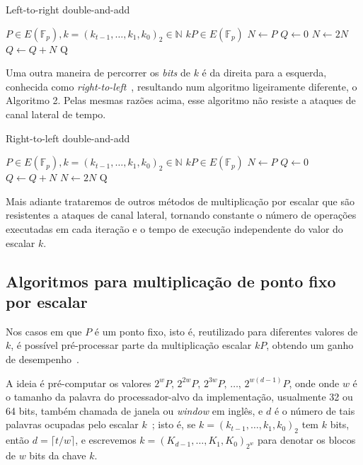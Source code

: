 \documentclass{SBCbookchapter}
\begin{document}
\begin{algorithm}[H]
\caption{Left-to-right double-and-add}
\begin{algorithmic}[1] 
    \REQUIRE $P \in E(\mathbb{F}_p), k=(k_{t-1},\ldots,k_1,k_0)_2 \in \mathbb{N}$
    \ENSURE $kP \in E(\mathbb{F}_p)$
    \STATE $N \leftarrow P$
    \STATE $Q \leftarrow 0$
        \STATE $N \leftarrow 2N$
            \STATE $Q \leftarrow Q+N$
        \ENDIF
    \ENDFOR
    \RETURN Q
    \end{algorithmic}
\end{algorithm}

Uma outra maneira de percorrer os \textit{bits} de $k$ é da direita para a esquerda, conhecida como \textit{right-to-left}~\cite{DBLP:journals/iacr/Rivain11}, resultando num algoritmo ligeiramente diferente, o Algoritmo 2. Pelas mesmas razões acima, esse algoritmo não resiste a ataques de canal lateral de tempo. 

\begin{algorithm}[H]
\caption{Right-to-left double-and-add}
\begin{algorithmic}[1]
    \REQUIRE $P \in E(\mathbb{F}_p), k=(k_{t-1},\ldots,k_1,k_0)_2 \in \mathbb{N}$
    \ENSURE $kP \in E(\mathbb{F}_p)$
    \STATE $N \leftarrow P$
    \STATE $Q \leftarrow 0$
            \STATE $Q \leftarrow Q + N$
        \ENDIF
        \STATE $N \leftarrow 2N$
    \ENDFOR
    \RETURN Q
    \end{algorithmic}
\end{algorithm}

Mais adiante trataremos de outros métodos de multiplicação por escalar que são resistentes a ataques de canal lateral, tornando constante o número de operações executadas em cada iteração e o tempo de execução independente do valor do escalar $k$.

\subsection{Algoritmos para multiplicação de ponto fixo por escalar}

Nos casos em que $P$ é um ponto fixo, isto é, reutilizado para diferentes valores de $k$, é possível pré-processar parte da  multiplicação escalar $kP$, obtendo um ganho de desempenho~\cite{Hankerson:2003:GEC:940321}.

A ideia é pré-computar os valores $2^wP,\, 2^{2w}P,\, 2^{3w}P,\,\ldots,\, 2^{w(d-1)}P$, onde onde $w$ é o tamanho da palavra do processador-alvo da implementação, usualmente 32 ou 64 bits, também chamada de janela ou \emph{window} em inglês, e $d$ é o número de tais palavras ocupadas pelo escalar $k$~\cite{Hankerson:2003:GEC:940321}; isto é, se $k=(k_{t-1}, \ldots, k_1, k_0)_2$ tem $k$ bits, então $d=\lceil t/w \rceil$, e escrevemos $k=(K_{d-1}, \ldots, K_1, K_0)_{2^w}$ para denotar os blocos de $w$ bits da chave $k$. 
\end{document}
